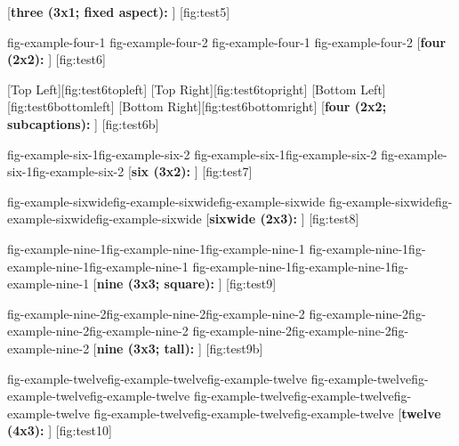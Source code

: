 \figfloat
    {}
    [\textbf{three (3x1; fixed aspect):} \lipsum[1][1-5]]
    [fig:test5]

\figfloat
    {
        \figfour
        {fig-example-four-1}
        {fig-example-four-2}
        {fig-example-four-1}
        {fig-example-four-2}
    }
    [\textbf{four (2x2):} \lipsum[1][1-5]]
    [fig:test6]

\figfloat
    {
        \figfour
        {[Top Left][fig:test6topleft]}
        {[Top Right][fig:test6topright]}
        {[Bottom Left][fig:test6bottomleft]}
        {[Bottom Right][fig:test6bottomright]}
    }
    [\textbf{four (2x2; subcaptions):} \lipsum[1][1-5]]
    [fig:test6b]

\figfloat
    {
        \figsix
        {{fig-example-six-1}{fig-example-six-2}}
        {{fig-example-six-1}{fig-example-six-2}}
        {{fig-example-six-1}{fig-example-six-2}}
    }
    [\textbf{six (3x2):} \lipsum[1][1-5]]
    [fig:test7]

\figfloat
    {
        \figsixwide
        {{fig-example-sixwide}{fig-example-sixwide}{fig-example-sixwide}}
        {{fig-example-sixwide}{fig-example-sixwide}{fig-example-sixwide}}
    }
    [\textbf{sixwide (2x3):} \lipsum[1][1-5]]
    [fig:test8]

\figfloat
    {
        \fignine
        {{fig-example-nine-1}{fig-example-nine-1}{fig-example-nine-1}}
        {{fig-example-nine-1}{fig-example-nine-1}{fig-example-nine-1}}
        {{fig-example-nine-1}{fig-example-nine-1}{fig-example-nine-1}}
    }
    [\textbf{nine (3x3; square):} \lipsum[1][1-4]]
    [fig:test9]

\figfloat
    {
        \fignine
        {{fig-example-nine-2}{fig-example-nine-2}{fig-example-nine-2}}
        {{fig-example-nine-2}{fig-example-nine-2}{fig-example-nine-2}}
        {{fig-example-nine-2}{fig-example-nine-2}{fig-example-nine-2}}
    }
    [\textbf{nine (3x3; tall):} \lipsum[1][1-5]]
    [fig:test9b]

\figfloat
    {
        \figtwelve
        {{fig-example-twelve}{fig-example-twelve}{fig-example-twelve}}
        {{fig-example-twelve}{fig-example-twelve}{fig-example-twelve}}
        {{fig-example-twelve}{fig-example-twelve}{fig-example-twelve}}
        {{fig-example-twelve}{fig-example-twelve}{fig-example-twelve}}
    }
    [\textbf{twelve (4x3):} \lipsum[1][1-5]]
    [fig:test10]

